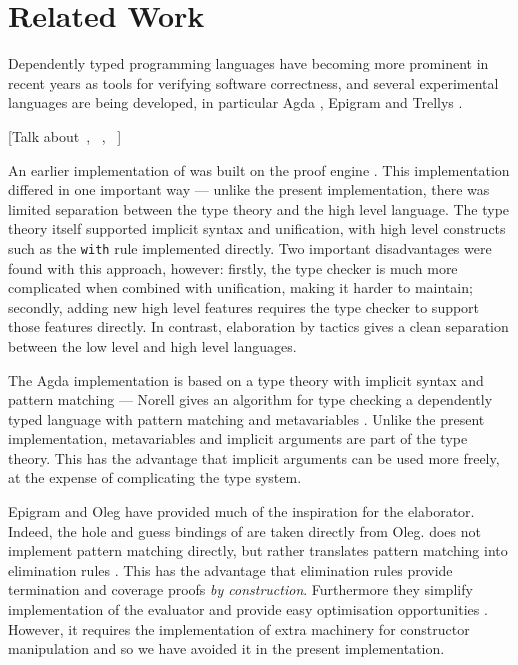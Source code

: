 \section{Related Work}

\label{sect:related}

Dependently typed programming languages have becoming more prominent in recent
years as tools for verifying software correctness, and several experimental
languages are being developed, in particular Agda \cite{norell2007thesis}, Epigram
\cite{McBride2004a,Levitation2010} and Trellys \cite{Kimmell2012}.

[Talk about~\cite{Asperti}, ~\cite{OutsideIn}, ~\cite{Sozeau2008}]

An earlier implementation of \Idris{} was built on the \Ivor{} proof engine 
\cite{Brady2006b}. This implementation differed in one important way --- unlike
the present implementation, there was limited separation between the type theory
and the high level language. The type theory itself supported implicit syntax and
unification, with high level constructs such as the \texttt{with} rule implemented
directly. Two important disadvantages were found with this approach, however: 
firstly, the type checker is much more complicated when combined with
unification, making it harder to maintain; secondly, adding new high level features
requires the type checker to support those features directly. In contrast, elaboration
by tactics gives a clean separation between the low level and high level languages.

The Agda implementation is based on a type theory with
implicit syntax and pattern matching --- Norell gives an algorithm for type checking
a dependently typed language with pattern matching and metavariables 
\cite{norell2007thesis}. Unlike the present \Idris{} implementation, metavariables
and implicit arguments are part of the type theory. This has the advantage that
implicit arguments can be used more freely, at the expense of complicating the type
system.

Epigram \cite{McBride2004a} and Oleg \cite{McBride1999} 
have provided much of the inspiration for the \Idris{} elaborator. Indeed,
the hole and guess bindings of \TTdev{} are taken directly from Oleg.
\Epigram{} does not implement pattern matching directly, but rather translates
pattern matching into elimination rules \cite{McBride2002}. This has the
advantage that
elimination rules provide termination and coverage proofs \emph{by construction}.
Furthermore they simplify implementation of the evaluator and provide easy
optimisation opportunities \cite{Brady2003}. However, it requires the
implementation of extra machinery for constructor manipulation
\cite{McBride2006} and so we have avoided it in the present implementation.

